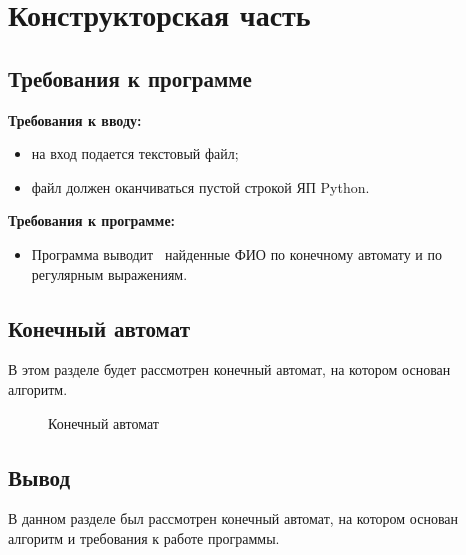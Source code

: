 \documentclass[12pt]{report}
\begin{document}
\chapter{Конструкторская часть}
\section{Требования к программе}
\textbf{Требования к вводу:}
\begin{itemize}
	\item на вход подается текстовый файл;
	\item файл должен оканчиваться пустой строкой
ЯП Python.
\end{itemize}
\textbf{Требования к программе:}
\begin{itemize}
	\item Программа выводит  найденные ФИО по конечному автомату и по регулярным выражениям.
\end{itemize}

\section{Конечный автомат}
В этом разделе будет рассмотрен конечный автомат, на котором основан алгоритм.

\begin{figure}[h]
	\caption{Конечный автомат}
	\label{ris:example}
\end{figure}

\section{Вывод}
В данном разделе был рассмотрен конечный автомат, на котором основан алгоритм и требования к работе программы.
\end{document}
